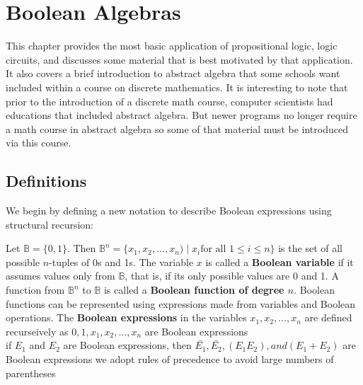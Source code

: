 



\chapter {Boolean Algebras}
This chapter provides the most basic application of propositional logic, logic circuits, and discusses some material that is best motivated by that application. It also covers a brief introduction to abstract algebra that some schools want included within a course on discrete mathematics. It is interesting to note that prior to the introduction of a discrete math course, computer scientists had educations that included abstract algebra. But newer programs no longer require a math course in abstract algebra so some of that material must be introduced via this course. 

\section {Definitions}
We begin by defining a new notation to describe Boolean expressions using structural recursion:

\begin{definition}
Let $\mathbb{B} = \{0,1\}$. Then $\mathbb{B}^n = \{x_1,x_2,\dots ,x_n) \mid x_i \text{for all }1\le i\le n\}$ is the set of all possible $n$-tuples of 0s and 1s. The variable $x$ is called a \textbf{Boolean variable} if it assumes values only from $\mathbb{B}$, that is, if its only possible values are 0 and 1. A function from $\mathbb{B}^n$ to $\mathbb{B}$ is called a \textbf{Boolean function of degree $n$}. 
Boolean functions can be represented using expressions made from variables and Boolean operations. The \textbf{Boolean expressions} in the variables $x_1,x_2,\dots ,x_n$ are defined recurseively as
$0,1,x_1,x_2,\dots,x_n$ are Boolean expressions \\
if $E_1$ and $E_2$ are Boolean expressions, then $\bar{E_1}, \bar{E_2}, (E_1E_2), and (E_1+E_2)$  are Boolean expressions
we adopt rules of precedence to avoid large numbers of parentheses
\end{definition}


